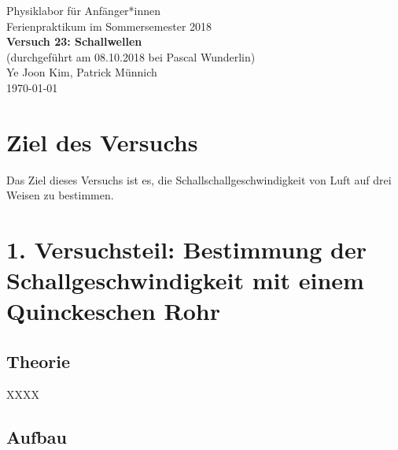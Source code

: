 \documentclass[11pt,a4paper]{article}
\begin{document}
{
\centering 
\large 
Physiklabor für Anf\"anger*innen \\
Ferienpraktikum im Sommersemester 2018 \\[4mm]
\textbf{\LARGE 
Versuch 23: Schallwellen
} \\[3mm]
(durchgef\"uhrt am 08.10.2018 bei Pascal Wunderlin) \\
Ye Joon Kim, Patrick M\"unnich\\
\today \\[10mm]
}

\vspace{50pt}
\tableofcontents
\vspace{22pt}
\listoftables
\vspace{22pt}
\listoffigures
\pagebreak

\section{Ziel des Versuchs}
Das Ziel dieses Versuchs ist es, die Schallschallgeschwindigkeit von Luft auf drei Weisen zu bestimmen. 

\section{1. Versuchsteil: Bestimmung der Schallgeschwindigkeit mit einem Quinckeschen Rohr}

\subsection{Theorie}

XXXX

\subsection{Aufbau}
\end{document}
